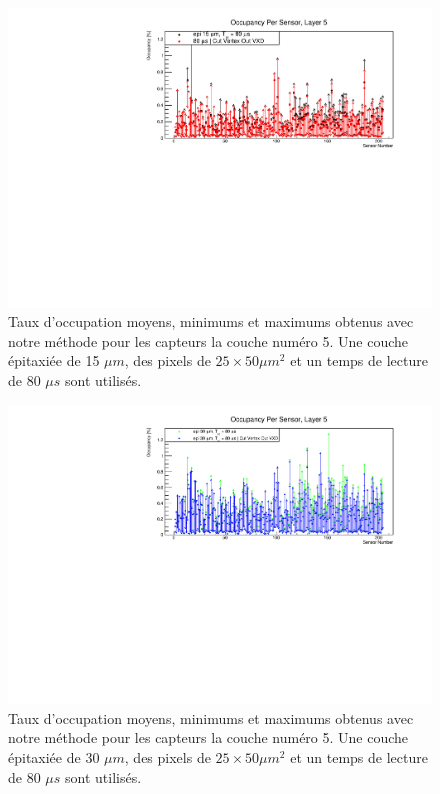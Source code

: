 \begin{appendices}
  \begin{figure}[!htb]
    \begin{center}
      \includegraphics[scale=0.80]{./figures/sensors_Readout_Time/resultOccupancyPerSensor/occupancyPerSensor_Layer5_epi_15um_Min_Max.pdf}
      \caption{Taux d'occupation moyens, minimums et maximums obtenus avec notre m\'ethode pour les capteurs la couche num\'ero 5. Une couche \'epitaxi\'ee de 15 $\mu m$, des pixels de $25 \times 50 \mu m^2$ et un temps de lecture de 80 $\mu s$ sont utilis\'es.}
      \label{fig:OccupancyLayer5_epi15um_Min_Max}
    \end{center}
  \end{figure}
  
  \begin{figure}[!htb]
    \begin{center}
      \includegraphics[scale=0.80]{./figures/sensors_Readout_Time/resultOccupancyPerSensor/occupancyPerSensor_Layer5_epi_30um_Min_Max.pdf}
      \caption{Taux d'occupation moyens, minimums et maximums obtenus avec notre m\'ethode pour les capteurs la couche num\'ero 5. Une couche \'epitaxi\'ee de 30 $\mu m$, des pixels de $25 \times 50 \mu m^2$ et un temps de lecture de 80 $\mu s$ sont utilis\'es.}
      \label{fig:OccupancyLayer5_epi30um_Min_Max}
    \end{center}
  \end{figure}  
  
  
  
\end{appendices} 